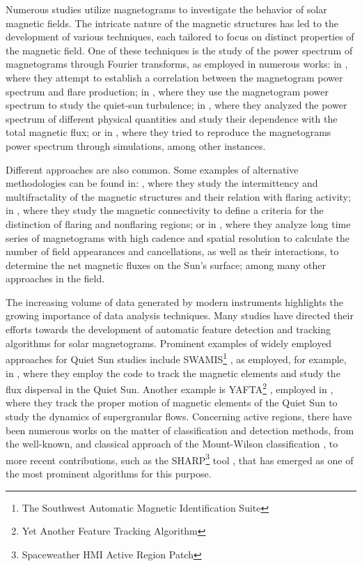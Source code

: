 Numerous studies utilize magnetograms to investigate the behavior of solar magnetic fields. The intricate nature of the magnetic structures has led to the development of various techniques, each tailored to focus on distinct properties of the magnetic field. One of these techniques is the study of the power spectrum of magnetograms through Fourier transforms, as employed in numerous works: in \cite{power_spectrum1}, where they attempt to establish a correlation between the magnetogram power spectrum and flare production; in \cite{power_spectrum_2}, where they use the magnetogram power spectrum to study the quiet-sun turbulence; in \cite{power_spectrum_3}, where they analyzed the power spectrum of different physical quantities and study their dependence with the total magnetic flux; or in  \cite{power_spectrum_4}, where they tried to reproduce the magnetograms power spectrum through simulations, among other instances. 

Different approaches are also common. Some examples of alternative methodologies can be found in: \cite{intermitency}, where they study the intermittency and multifractality of the magnetic structures and their relation with flaring activity; in \cite{conectivity}, where they study the magnetic connectivity to define a criteria for the distinction of flaring and nonflaring regions; or in \cite{gosic}, where they analyze long time series of magnetograms with high cadence and spatial resolution to calculate the number of field appearances and cancellations, as well as their interactions, to determine the net magnetic fluxes on the Sun's surface; among many other approaches in the field.

The increasing volume of data generated by modern instruments highlights the growing importance of data analysis techniques. Many studies have directed their efforts towards the development of automatic feature detection and tracking algorithms for solar magnetograms. Prominent examples of widely employed approaches for Quiet Sun studies include SWAMIS\footnote{The Southwest Automatic Magnetic Identification Suite} \citep{swamis_yafta}, as employed, for example, in \cite{swamis_example}, where they employ the code to track the magnetic elements and study the flux dispersal in the Quiet Sun. Another example is YAFTA\footnote{Yet Another Feature Tracking Algorithm} \citep{yafta}, employed in \cite{yafta_example},  where they track the proper motion of magnetic elements of the Quiet Sun to study the dynamics of supergranular flows. Concerning active regions, there have been numerous works on the matter of classification and detection methods, from the well-known, and classical approach of the Mount-Wilson classification \citep{hale}, to more recent contributions, such as the SHARP\footnote{Spaceweather HMI Active Region Patch} tool \citep{sharp}, that has emerged as one of the most prominent algorithms for this purpose.

